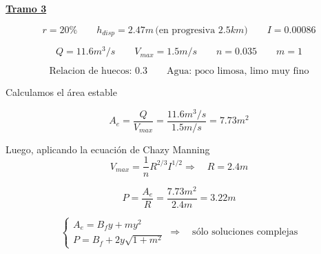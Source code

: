 \underline{\bf Tramo 3}


\begin{equation*}
  r = 20\%
 \qquad
  h_{disp} = 2.47 m \,\text{(en progresiva }2.5 km \text{)}
 \qquad
  I = 0.00086
\end{equation*}

\begin{equation*}
  Q = 11.6 m^3/s
 \qquad
  V_{max} = 1.5 m/s
 \qquad
  n = 0.035
 \qquad
  m = 1
\end{equation*}

\begin{equation*}
  \text{Relacion de huecos: 0.3}
  \qquad
  \text{Agua: poco limosa, limo muy fino}
\end{equation*}

Calculamos el área estable

\begin{equation*}
 A_{e} = \dfrac{Q}{V_{max}} = \dfrac{11.6 m^3/s}{1.5 m/s} = 7.73 m^2
\end{equation*}

Luego, aplicando la ecuación de Chazy Manning
\begin{equation*}
 V_{max} =  \frac{1}{n} R^{2/3} I^{1/2}
 \Longrightarrow \quad
 R = 2.4 m
\end{equation*}

\begin{equation*}
 P = \dfrac{A_{e}}{R} = \dfrac{7.73 m^2}{2.4 m} = 3.22 m
\end{equation*}

\begin{equation*}
  \begin{cases}
    A_e = B_{f}y + m y^{2} \\
    P = B_{f} + 2 y \sqrt{1 + m^{2}}
  \end{cases}
  \Longrightarrow \quad
  \text{sólo soluciones complejas}
\end{equation*}
